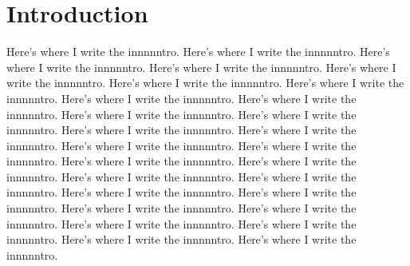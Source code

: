 \chapter[Introduction]{Introduction}
\label{ch:intro}

Here's where I write the innnnntro. Here's where I write the innnnntro. Here's where I write the innnnntro. Here's where I write the innnnntro. Here's where I write the innnnntro. Here's where I write the innnnntro. Here's where I write the innnnntro. Here's where I write the innnnntro. Here's where I write the innnnntro. Here's where I write the innnnntro. Here's where I write the innnnntro. Here's where I write the innnnntro. Here's where I write the innnnntro. Here's where I write the innnnntro. Here's where I write the innnnntro. Here's where I write the innnnntro. Here's where I write the innnnntro. Here's where I write the innnnntro. Here's where I write the innnnntro. Here's where I write the innnnntro. Here's where I write the innnnntro. Here's where I write the innnnntro. Here's where I write the innnnntro. Here's where I write the innnnntro. Here's where I write the innnnntro. Here's where I write the innnnntro. Here's where I write the innnnntro.